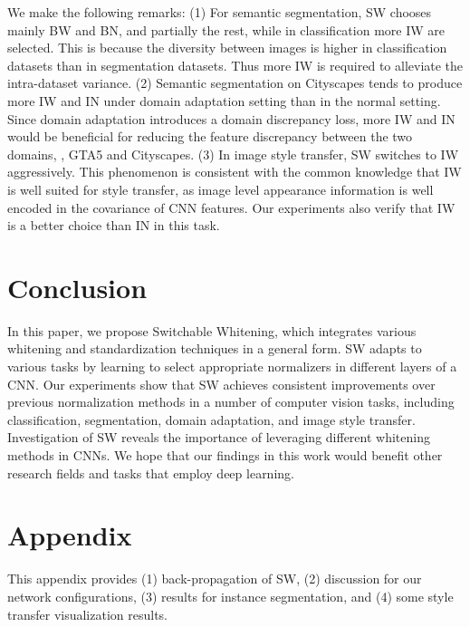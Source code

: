 \documentclass[10pt,twocolumn,letterpaper]{article}
\begin{document}
We make the following remarks: 
(1) For semantic segmentation, SW chooses mainly BW and BN, and partially the rest, while in classification more IW are selected.
This is because the diversity between images is higher in classification datasets than in segmentation datasets.
Thus more IW is required to alleviate the intra-dataset variance. (2) Semantic segmentation on Cityscapes tends to produce more IW and IN under domain adaptation setting than in the normal setting.
Since domain adaptation introduces a domain discrepancy loss, more IW and IN would be beneficial for reducing the feature discrepancy between the two domains, \ie, GTA5 and Cityscapes.
(3) In image style transfer, SW switches to IW aggressively.
This phenomenon is consistent with the common knowledge that IW is well suited for style transfer, as image level appearance information is well encoded in the covariance of CNN features.
Our experiments also verify that IW is a better choice than IN in this task.
 	\section{Conclusion}

In this paper, we propose Switchable Whitening, which integrates various whitening and standardization techniques in a general form.
SW adapts to various tasks by learning to select appropriate normalizers in different layers of a CNN.
Our experiments show that SW achieves consistent improvements over previous normalization methods in a number of computer vision tasks, including classification, segmentation, domain adaptation, and image style transfer.
Investigation of SW reveals the importance of leveraging different whitening methods in CNNs.
We hope that our findings in this work would benefit other research fields and tasks that employ deep learning. 	
	{\small
		
		
	}

	\clearpage

\setcounter{section}{0}
\renewcommand\thesection{\Alph{section}}

\section*{\fontsize{15}{15}\selectfont Appendix}

This appendix provides (1) back-propagation of SW, (2) discussion for our network configurations, (3) results for instance segmentation, and (4) some style transfer visualization results.
\end{document}
